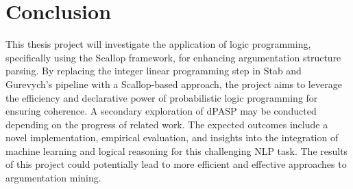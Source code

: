 \documentclass{article}
\begin{document}
\section{Conclusion}

This thesis project will investigate the application of logic programming,
specifically using the Scallop framework, for enhancing argumentation structure
parsing. By replacing the integer linear programming step in Stab and Gurevych's
pipeline with a Scallop-based approach, the project aims to leverage the
efficiency and declarative power of probabilistic logic programming for ensuring
coherence. A secondary exploration of dPASP may be conducted depending on the
progress of related work. The expected outcomes include a novel implementation,
empirical evaluation, and insights into the integration of machine learning and
logical reasoning for this challenging NLP task. The results of this project
could potentially lead to more efficient and effective approaches to
argumentation mining.



\end{document}
